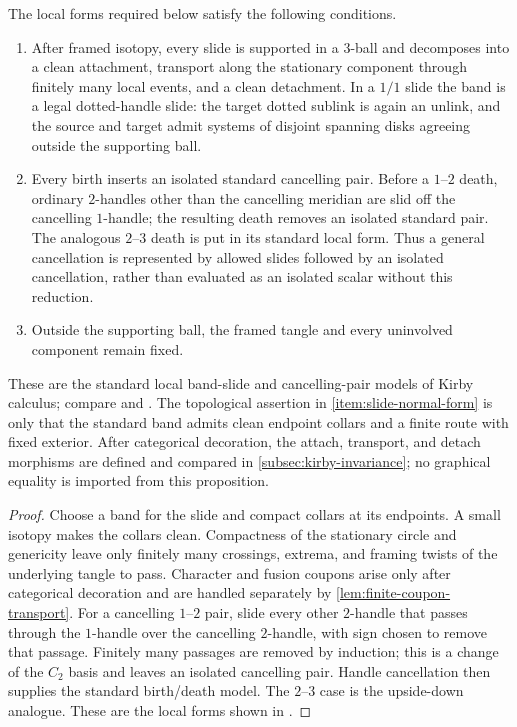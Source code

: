 \begin{proposition}
\label{prop:local-movie-normal-forms}
The local forms required below satisfy the following conditions.
\begin{enumerate}[label=(\roman*),ref=\roman*]
  \item\label{item:slide-normal-form}
  After framed isotopy, every slide is supported in a $3$-ball and decomposes
  into a clean attachment, transport along the stationary component through
  finitely many local events, and a clean detachment.  In a $1/1$ slide the
  band is a legal dotted-handle slide: the target dotted sublink is again an
  unlink, and the source and target admit systems of disjoint spanning disks
  agreeing outside the supporting ball.

  \item\label{item:cancellation-normal-form}
  Every birth inserts an isolated standard cancelling pair.  Before a
  $1$--$2$ death, ordinary $2$-handles other than the cancelling meridian are
  slid off the cancelling $1$-handle; the resulting death removes an isolated
  standard pair.  The analogous $2$--$3$ death is put in its standard local
  form.  Thus a general cancellation is represented by allowed slides
  followed by an isolated cancellation, rather than evaluated as an
  isolated scalar without this reduction.

  \item\label{item:fixed-exterior}
  Outside the supporting ball, the framed tangle and every uninvolved
  component remain fixed.
\end{enumerate}
These are the standard local band-slide and cancelling-pair models of Kirby
calculus; compare \cite[Sections~5.1 and~5.4]{GompfStipsicz1999} and
\cite[Table~2]{BarenzBarrett2018}.  The topological assertion in
\cref{item:slide-normal-form} is only that the standard band admits clean
endpoint collars and a finite route with fixed exterior.  After categorical
decoration, the attach, transport, and detach morphisms are defined and
compared in \cref{subsec:kirby-invariance}; no graphical equality is imported
from this proposition.
\end{proposition}

\begin{proof}
Choose a band for the slide and compact collars at its endpoints.  A small
isotopy makes the collars clean.  Compactness of the stationary circle and
genericity leave only finitely many crossings, extrema, and framing twists
of the underlying tangle to pass.  Character and fusion coupons arise only
after categorical decoration and are handled separately by
\cref{lem:finite-coupon-transport}.  For a cancelling $1$--$2$ pair, slide
every other $2$-handle that
passes through the $1$-handle over the cancelling $2$-handle, with sign
chosen to remove that passage.  Finitely many passages are removed by
induction; this is a change of the $C_2$ basis and leaves an isolated
cancelling pair.  Handle cancellation then supplies the standard
birth/death model.  The $2$--$3$ case is the upside-down analogue.  These are
the local forms shown in
\cite[Table~2 and its caption]{BarenzBarrett2018}.
\end{proof}
